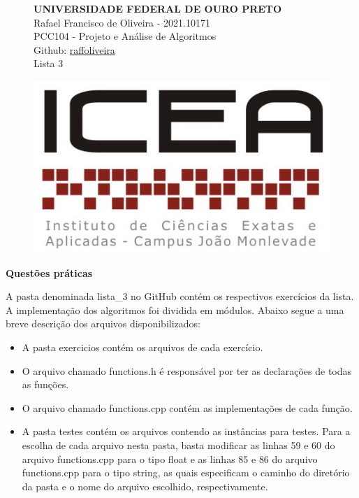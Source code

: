 \documentclass[12pt,a4paper]{article}
\begin{document}
\begin{figure}[H]
\begin{minipage}[]{0.07\linewidth}
	\end{minipage}
\hfill
	\begin{minipage}[]{0.6\linewidth}
		\centering
	\textbf{UNIVERSIDADE FEDERAL DE OURO PRETO\\}
		Rafael Francisco de Oliveira - 2021.10171\\
		PCC104 - Projeto e Análise de Algoritmos\\
		Github: \href{https://github.com/raffoliveira/Master_Degree}{raffoliveira}\\
		Lista 3
		
	\end{minipage}
\hfill	
	\begin{minipage}[c]{0.15\linewidth}
	\includegraphics[width=\linewidth]{images/icea.jpg}	
	\end{minipage}

\vspace{0.5cm}
\hrulefill
\end{figure}

{\Large \textbf{Questões práticas}}

\vspace{0.5cm}

A pasta denominada \textsf{lista\_3} no GitHub contém os respectivos exercícios da lista. A implementação dos algoritmos foi dividida em módulos. Abaixo segue a uma breve descrição dos arquivos disponibilizados:

\begin{itemize}
	\item A pasta \textsf{exercicios} contém os arquivos de cada exercício.
	\item O arquivo chamado \textsf{functions.h} é responsável por ter as declarações de todas as funções.
	\item O arquivo chamado \textsf{functions.cpp} contém as implementações de cada função. 
	\item A pasta \textsf{testes} contém os arquivos contendo as instâncias para testes. Para a escolha de cada arquivo nesta pasta, basta modificar as linhas \textsf{59} e \textsf{60} do arquivo \textsf{functions.cpp}  para o tipo \textsf{float} e as linhas \textsf{85} e \textsf{86} do arquivo \textsf{functions.cpp}  para o tipo \textsf{string}, as quais especificam o caminho do diretório da pasta e o nome do arquivo escolhido, respectivamente. 
\end{itemize}
\end{document}
